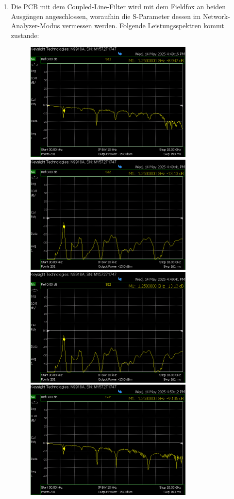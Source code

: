 


\begin{enumerate}
    \item Die PCB mit dem Coupled-Line-Filter wird mit dem Fieldfox an beiden Ausgängen angeschlossen, 
    woraufhin die S-Parameter dessen im Network-Analyzer-Modus vermessen werden. Folgende Leistungsspektren kommt zustande:
    \begin{figure}[H]
        
        \includegraphics[height=6cm]{Pictures/S11neuCooleGrupp.png}
        \includegraphics[height=6cm]{Pictures/S12neuCooleGrupp.png}
        \includegraphics[height=6cm]{Pictures/S12neuCooleGrupp.png}
        \includegraphics[height=6cm]{Pictures/S22neuCooleGruppe.png}

\end{figure}
\end{enumerate}
